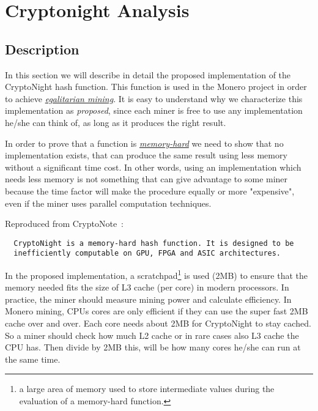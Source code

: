 
\chapter{Cryptonight Analysis} \label{ch:cryptonight}
%
%
\section{Description}
In this section we will describe in detail the proposed implementation of the CryptoNight hash function. This function is used in the Monero project in order to achieve \hyperref[sec:egalitarian]{\emph{egalitarian mining}}. It is easy to understand why we characterize this implementation as \emph{proposed}, since each miner is free to use any implementation he/she can think of, as long as it produces the right result.

In order to prove that a function is \hyperref[sec:memory-hard]{\emph{memory-hard}} we need to show that no implementation exists, that can produce the same result using less memory without a significant time cost. In other words, using an implementation which needs less memory is not something that can give advantage to some miner because the time factor will make the procedure equally or more "expensive", even if the miner uses parallel computation techniques.

\noindent Reproduced from CryptoNote~\cite{cryptonight}:
\begin{verbatim}
  CryptoNight is a memory-hard hash function. It is designed to be
  inefficiently computable on GPU, FPGA and ASIC architectures.
\end{verbatim}
In the proposed implementation, a scratchpad\footnote{a large area of memory used to store intermediate values during the evaluation of a memory-hard function.} is used (2MB) to ensure that the memory needed fits the size of L3 cache (per core) in modern processors. In practice, the miner should measure mining power and calculate efficiency. In Monero mining, CPUs cores are only efficient if they can use the super fast 2MB cache over and over. Each core needs about 2MB for CryptoNight to stay cached. So a miner should check how much L2 cache or in rare cases also L3 cache the CPU has. Then divide by 2MB this, will be how many cores he/she can run at the same time.

